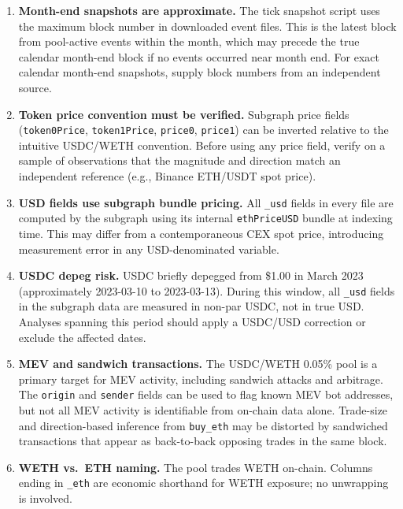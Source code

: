 \documentclass[11pt,a4paper]{article}
\begin{document}
\begin{enumerate}
  \item \textbf{Month-end snapshots are approximate.} The tick snapshot
        script uses the maximum block number in downloaded event files. This
        is the latest block from pool-active events within the month, which
        may precede the true calendar month-end block if no events occurred
        near month end. For exact calendar month-end snapshots, supply block
        numbers from an independent source.

  \item \textbf{Token price convention must be verified.} Subgraph price
        fields (\texttt{token0Price}, \texttt{token1Price}, \texttt{price0},
        \texttt{price1}) can be inverted relative to the intuitive USDC/WETH
        convention. Before using any price field, verify on a sample of
        observations that the magnitude and direction match an independent
        reference (e.g., Binance ETH/USDT spot price).

  \item \textbf{USD fields use subgraph bundle pricing.}
        All \texttt{\_usd} fields in every file are computed by the subgraph
        using its internal \texttt{ethPriceUSD} bundle at indexing time.
        This may differ from a contemporaneous CEX spot price, introducing
        measurement error in any USD-denominated variable.

  \item \textbf{USDC depeg risk.} USDC briefly depegged from \$1.00 in
        March 2023 (approximately 2023-03-10 to 2023-03-13). During this
        window, all \texttt{\_usd} fields in the subgraph data are measured
        in non-par USDC, not in true USD. Analyses spanning this period
        should apply a USDC/USD correction or exclude the affected dates.

  \item \textbf{MEV and sandwich transactions.} The USDC/WETH 0.05\% pool
        is a primary target for MEV activity, including sandwich attacks and
        arbitrage. The \texttt{origin} and \texttt{sender} fields can be
        used to flag known MEV bot addresses, but not all MEV activity is
        identifiable from on-chain data alone. Trade-size and
        direction-based inference from \texttt{buy\_eth} may be distorted by
        sandwiched transactions that appear as back-to-back opposing trades
        in the same block.

  \item \textbf{WETH vs.\ ETH naming.} The pool trades WETH on-chain.
        Columns ending in \texttt{\_eth} are economic shorthand for WETH
        exposure; no unwrapping is involved.


\end{enumerate}
\end{document}
